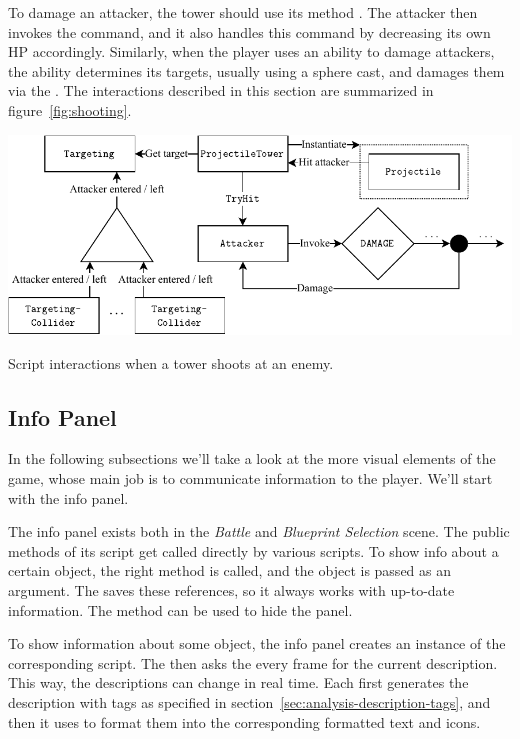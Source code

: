To damage an attacker, the tower should use its method .
The attacker then invokes the  command, and it also handles this command by decreasing its own HP accordingly.
Similarly, when the player uses an ability to damage attackers, the ability determines its targets, usually using a sphere cast, and damages them via the .
The interactions described in this section are summarized in figure~\ref{fig:shooting}.

\begin{center}
    \captionsetup{type=figure}
    \includegraphics[width=\textwidth]{img/shooting.pdf}
    \caption{Script interactions when a tower shoots at an enemy.}
    \label{fig:shooting}
\end{center}

\subsection{Info Panel}\label{sec:docs-info-panel}

In the following subsections we'll take a look at the more visual elements of the game, whose main job is to communicate information to the player.
We'll start with the info panel.

The info panel exists both in the \emph{Battle} and \emph{Blueprint Selection} scene.
The public methods of its  script get called directly by various scripts.
To show info about a certain object, the right method is called, and the object is passed as an argument.
The  saves these references, so it always works with up-to-date information.
The  method can be used to hide the panel.

To show information about some object, the info panel creates an instance of the corresponding  script.
The  then asks the  every frame for the current description.
This way, the descriptions can change in real time.
Each  first generates the description with tags as specified in section~\ref{sec:analysis-description-tags}, and then it uses  to format them into the corresponding formatted text and icons.

